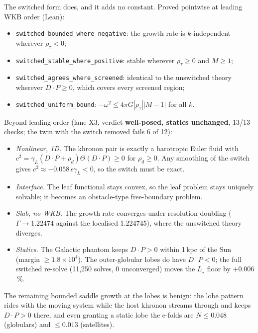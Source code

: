 \documentclass[10pt]{article}
\begin{document}
The switched form does, and it adds no constant. Proved pointwise at leading WKB order (Lean):
\begin{itemize}
\item \texttt{switched\_bounded\_where\_negative}: the growth rate is $k$-independent wherever $\rho_\tau<0$;
\item \texttt{switched\_stable\_where\_positive}: stable wherever $\rho_\tau\ge0$ and $M\ge1$;
\item \texttt{switched\_agrees\_where\_screened}: identical to the unswitched theory wherever $D\!\cdot\!P\ge0$, which covers every screened region;
\item \texttt{switched\_uniform\_bound}: $-\omega^2\le4\pi G|\rho_\tau||M-1|$ for all $k$.
\end{itemize}
Beyond leading order (lane X3, verdict \textbf{well-posed, statics unchanged}, 13/13 checks; the twin with the switch removed fails 6 of 12):
\begin{itemize}
\item \emph{Nonlinear, 1D.} The khronon pair is exactly a barotropic Euler fluid with $c^2=\gamma_L(D\!\cdot\!P+\rho_d)\Theta(D\!\cdot\!P)\ge0$ for $\rho_d\ge0$. Any smoothing of the switch gives $c^2\approx-0.058\,\epsilon\gamma_L<0$, so the switch must be exact.
\item \emph{Interface.} The leaf functional stays convex, so the leaf problem stays uniquely solvable; it becomes an obstacle-type free-boundary problem.
\item \emph{Slab, no WKB.} The growth rate converges under resolution doubling ($\Gamma\to1.22474$ against the localised 1.224745), where the unswitched theory diverges.
\item \emph{Statics.} The Galactic phantom keeps $D\!\cdot\!P>0$ within 1\,kpc of the Sun (margin $\ge1.8\times10^4$). The outer-globular lobes do have $D\!\cdot\!P<0$; the full switched re-solve (11,250 solves, 0 unconverged) moves the $L_\star$ floor by $+0.006$\,\%.
\end{itemize}
The remaining bounded saddle growth at the lobes is benign: the lobe pattern rides with the moving system while the host khronon streams through and keeps $D\!\cdot\!P>0$ there, and even granting a static lobe the e-folds are $N\le0.048$ (globulars) and $\le0.013$ (satellites).
\end{document}
